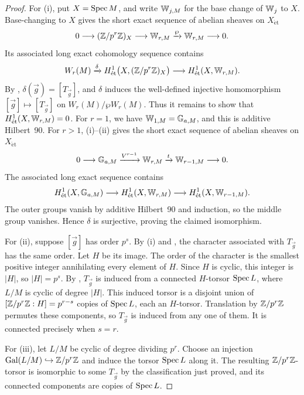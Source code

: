 \begin{proof}
For (i), put $X=\operatorname{Spec} M$, and write $\mathbb{W}_{j,M}$ for the base change of $\mathbb{W}_j$
to $X$. Base-changing  to $X$ gives the
short exact sequence of abelian sheaves on $X_{\mathrm{\acute et}}$
\[
0\longrightarrow(\mathbb{Z}/p^r\mathbb{Z})_X
\longrightarrow\mathbb{W}_{r,M}\xrightarrow{\wp}\mathbb{W}_{r,M}
\longrightarrow0.
\]
Its associated long exact cohomology sequence contains
\[
W_r(M)\xrightarrow{\delta}
H^1_{\mathrm{\acute et}}\bigl(X,(\mathbb{Z}/p^r\mathbb{Z})_X\bigr)
\longrightarrow H^1_{\mathrm{\acute et}}(X,\mathbb{W}_{r,M}).
\]
By , $\delta(\vec g)=[T_{\vec g}]$,
and $\delta$ induces the well-defined injective homomorphism
$[\vec g]\mapsto[T_{\vec g}]$ on $W_r(M)/\wp W_r(M)$.
Thus it remains to show that $H^1_{\mathrm{\acute et}}(X,\mathbb{W}_{r,M})=0$.
For $r=1$, we have $\mathbb{W}_{1,M}=\mathbb{G}_{a,M}$, and this is additive
Hilbert~90. For $r>1$, (i)--(ii) gives the
short exact sequence of abelian sheaves on $X_{\mathrm{\acute et}}$
\[
0\longrightarrow\mathbb{G}_{a,M}\xrightarrow{V^{r-1}}\mathbb{W}_{r,M}
\xrightarrow{t}\mathbb{W}_{r-1,M}\longrightarrow0.
\]
The associated long exact sequence contains
\[
H^1_{\mathrm{\acute et}}(X,\mathbb{G}_{a,M})
\longrightarrow
H^1_{\mathrm{\acute et}}(X,\mathbb{W}_{r,M})
\longrightarrow
H^1_{\mathrm{\acute et}}(X,\mathbb{W}_{r-1,M}).
\]
The outer groups vanish by additive Hilbert~90 and induction, so the middle
group vanishes. Hence $\delta$ is surjective, proving the claimed
isomorphism.

For (ii), suppose $[\vec g]$ has order $p^s$. By (i) and
, the character associated
with $T_{\vec g}$ has the same order. Let $H$ be its image. The order of
the character is the smallest positive integer annihilating every element
of $H$. Since $H$ is cyclic, this integer is $|H|$, so $|H|=p^s$.
By , $T_{\vec g}$ is induced
from a connected $H$-torsor $\operatorname{Spec} L$, where $L/M$ is cyclic of degree
$|H|$. This induced torsor is a disjoint union of
$[\mathbb{Z}/p^r\mathbb{Z}:H]=p^{r-s}$ copies of $\operatorname{Spec} L$, each an $H$-torsor.
Translation by $\mathbb{Z}/p^r\mathbb{Z}$ permutes these components, so $T_{\vec g}$ is
induced from any one of them. It is connected precisely when $s=r$.

For (iii), let $L/M$ be cyclic of degree dividing $p^r$. Choose an
injection $\operatorname{Gal}(L/M)\hookrightarrow\mathbb{Z}/p^r\mathbb{Z}$ and induce the torsor
$\operatorname{Spec} L$ along it. The resulting $\mathbb{Z}/p^r\mathbb{Z}$-torsor is isomorphic to some
$T_{\vec g}$ by the classification just proved, and its connected
components are copies of $\operatorname{Spec} L$.
\end{proof}


